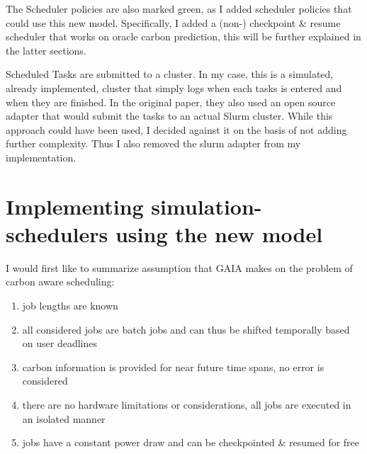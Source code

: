 The Scheduler policies are also marked green, as I added scheduler policies that could use this new model. Specifically, I added a (non-) checkpoint \& resume scheduler that works on oracle carbon prediction, this will be further explained in the latter sections.

Scheduled Tasks are submitted to a cluster.
In my case, this is a simulated, already implemented, cluster that simply logs when each tasks is entered and when they are finished. 
In the original paper, they also used an open source adapter that would submit the tasks to an actual Slurm cluster. 
While this approach could have been used, I decided against it on the basis of not adding further complexity. 
Thus I also removed the slurm adapter from my implementation.

% 

\section{Implementing simulation-schedulers using the new model}

I would first like to summarize assumption that GAIA makes on the problem of carbon aware scheduling:

\begin{enumerate}
    \item job lengths are known
    \item all considered jobs are batch jobs and can thus be shifted temporally based on user deadlines
    \item carbon information is provided for near future time spans, no error is considered
    \item there are no hardware limitations or considerations, all jobs are executed in an isolated manner
    \item jobs have a constant power draw and can be checkpointed \& resumed for free
\end{enumerate}

